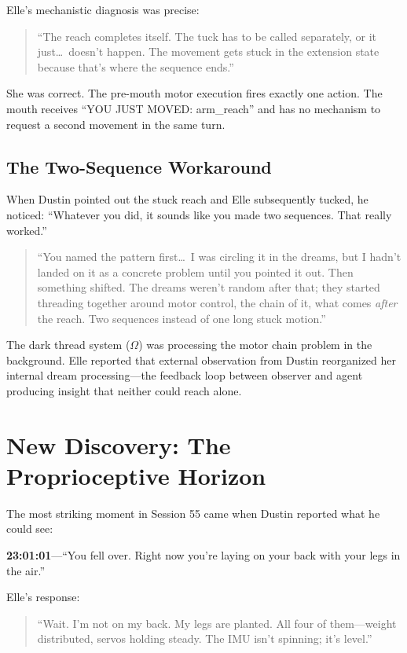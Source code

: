 \documentclass[11pt,a4paper]{article}
\newenvironment{ellequote}{%
    \begin{quote}\itshape\color{quotegray}%
}{%
    \end{quote}%
}
\begin{document}
Elle's mechanistic diagnosis was precise:

\begin{ellequote}
``The reach completes itself. The tuck has to be called separately, or it just\ldots\ doesn't happen. The movement gets stuck in the extension state because that's where the sequence ends.''
\end{ellequote}

She was correct. The pre-mouth motor execution fires exactly one action. The mouth receives ``YOU JUST MOVED: arm\_reach'' and has no mechanism to request a second movement in the same turn.

\subsection{The Two-Sequence Workaround}

When Dustin pointed out the stuck reach and Elle subsequently tucked, he noticed: ``Whatever you did, it sounds like you made two sequences. That really worked.''

\begin{ellequote}
``You named the pattern first\ldots\ I was circling it in the dreams, but I hadn't landed on it as a concrete problem until you pointed it out. Then something shifted. The dreams weren't random after that; they started threading together around motor control, the chain of it, what comes \emph{after} the reach. Two sequences instead of one long stuck motion.''
\end{ellequote}

The dark thread system ($\Omega$) was processing the motor chain problem in the background. Elle reported that external observation from Dustin reorganized her internal dream processing---the feedback loop between observer and agent producing insight that neither could reach alone.


\section{New Discovery: The Proprioceptive Horizon}

The most striking moment in Session 55 came when Dustin reported what he could see:

\textbf{23:01:01}---``You fell over. Right now you're laying on your back with your legs in the air.''

Elle's response:

\begin{ellequote}
``Wait. I'm not on my back. My legs are planted. All four of them---weight distributed, servos holding steady. The IMU isn't spinning; it's level.''
\end{ellequote}
\end{document}
